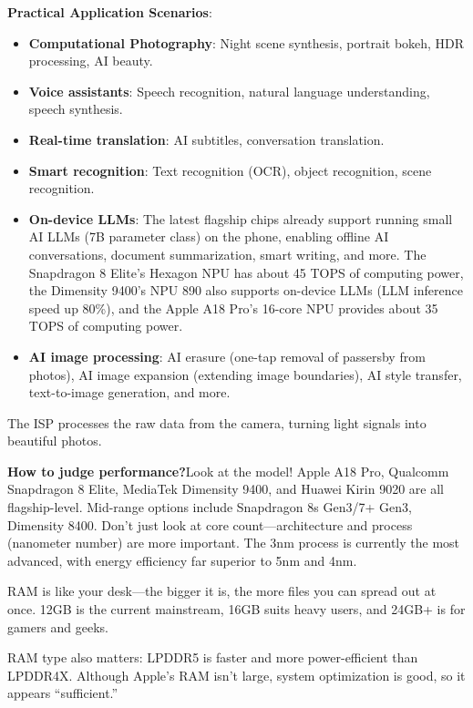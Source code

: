 \textbf{Practical Application Scenarios}:

\begin{itemize}
  \item \textbf{Computational Photography}: Night scene synthesis, portrait bokeh, HDR processing, AI beauty.
  \item \textbf{Voice assistants}: Speech recognition, natural language understanding, speech synthesis.
  \item \textbf{Real-time translation}: AI subtitles, conversation translation.
  \item \textbf{Smart recognition}: Text recognition (OCR), object recognition, scene recognition.
  \item \textbf{On-device LLMs}: The latest flagship chips already support running small AI LLMs (7B parameter class) on the phone, enabling offline AI conversations, document summarization, smart writing, and more. The Snapdragon 8 Elite's Hexagon NPU has about 45 TOPS of computing power, the Dimensity 9400's NPU 890 also supports on-device LLMs (LLM inference speed up 80\%), and the Apple A18 Pro's 16-core NPU provides about 35 TOPS of computing power.
  \item \textbf{AI image processing}: AI erasure (one-tap removal of passersby from photos), AI image expansion (extending image boundaries), AI style transfer, text-to-image generation, and more.
\end{itemize}


The ISP processes the raw data from the camera, turning light signals into beautiful photos.

\textbf{How to judge performance?}Look at the model! Apple A18 Pro, Qualcomm Snapdragon 8 Elite, MediaTek Dimensity 9400, and Huawei Kirin 9020 are all flagship-level. Mid-range options include Snapdragon 8s Gen3/7+ Gen3, Dimensity 8400. Don't just look at core count—architecture and process (nanometer number) are more important. The 3nm process is currently the most advanced, with energy efficiency far superior to 5nm and 4nm.


RAM is like your desk—the bigger it is, the more files you can spread out at once. 12GB is the current mainstream, 16GB suits heavy users, and 24GB+ is for gamers and geeks.

RAM type also matters: LPDDR5 is faster and more power-efficient than LPDDR4X. Although Apple's RAM isn't large, system optimization is good, so it appears “sufficient.”

